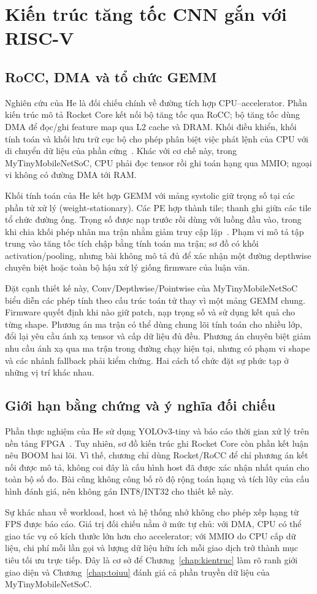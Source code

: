 \section{Kiến trúc tăng tốc CNN gắn với RISC-V}
\subsection{RoCC, DMA và tổ chức GEMM}
Nghiên cứu của He là đối chiếu chính về đường tích hợp CPU--accelerator. Phần kiến trúc mô tả Rocket Core kết nối bộ tăng tốc qua RoCC; bộ tăng tốc dùng DMA để đọc/ghi feature map qua L2 cache và DRAM. Khối điều khiển, khối tính toán và khối lưu trữ cục bộ cho phép phân biệt việc phát lệnh của CPU với di chuyển dữ liệu của phần cứng~\cite[Section~3, Figure~4]{he2021design}. Khác với cơ chế này, trong MyTinyMobileNetSoC, CPU phải đọc tensor rồi ghi toán hạng qua MMIO; ngoại vi không có đường DMA tới RAM.

Khối tính toán của He kết hợp GEMM với mảng systolic giữ trọng số tại các phần tử xử lý (weight-stationary). Các PE hợp thành tile; thanh ghi giữa các tile tổ chức đường ống. Trọng số được nạp trước rồi dùng với luồng đầu vào, trong khi chia khối phép nhân ma trận nhằm giảm truy cập lặp~\cite[Sections~2.2--3, Figure~5]{he2021design}. Phạm vi mô tả tập trung vào tăng tốc tích chập bằng tính toán ma trận; sơ đồ có khối activation/pooling, nhưng bài không mô tả đủ để xác nhận một đường depthwise chuyên biệt hoặc toàn bộ hậu xử lý giống firmware của luận văn.

Đặt cạnh thiết kế này, Conv/Depthwise/Pointwise của MyTinyMobileNetSoC biểu diễn các phép tính theo cấu trúc toán tử thay vì một mảng GEMM chung. Firmware quyết định khi nào giữ patch, nạp trọng số và sử dụng kết quả cho từng shape. Phương án ma trận có thể dùng chung lõi tính toán cho nhiều lớp, đổi lại yêu cầu ánh xạ tensor và cấp dữ liệu đủ đều. Phương án chuyên biệt giảm nhu cầu ánh xạ qua ma trận trong đường chạy hiện tại, nhưng có phạm vi shape và các nhánh fallback phải kiểm chứng. Hai cách tổ chức đặt sự phức tạp ở những vị trí khác nhau.

\subsection{Giới hạn bằng chứng và ý nghĩa đối chiếu}
Phần thực nghiệm của He sử dụng YOLOv3-tiny và báo cáo thời gian xử lý trên nền tảng FPGA~\cite[Section~4]{he2021design}. Tuy nhiên, sơ đồ kiến trúc ghi Rocket Core còn phần kết luận nêu BOOM hai lõi. Vì thế, chương chỉ dùng Rocket/RoCC để chỉ phương án kết nối được mô tả, không coi đây là cấu hình host đã được xác nhận nhất quán cho toàn bộ số đo. Bài cũng không công bố rõ độ rộng toán hạng và tích lũy của cấu hình đánh giá, nên không gán INT8/INT32 cho thiết kế này.

Sự khác nhau về workload, host và hệ thống nhớ không cho phép xếp hạng từ FPS được báo cáo. Giá trị đối chiếu nằm ở mức tự chủ: với DMA, CPU có thể giao tác vụ có kích thước lớn hơn cho accelerator; với MMIO do CPU cấp dữ liệu, chi phí mỗi lần gọi và lượng dữ liệu hữu ích mỗi giao dịch trở thành mục tiêu tối ưu trực tiếp. Đây là cơ sở để Chương~\ref{chap:kientruc} làm rõ ranh giới giao diện và Chương~\ref{chap:toiuu} đánh giá cả phần truyền dữ liệu của MyTinyMobileNetSoC.

